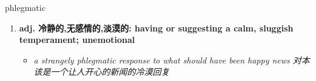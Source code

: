 
\begin{frame}
{\huge phlegmatic}
\begin{center}
\begin{enumerate}\Large
  \item \textbf{adj. 冷静的,无感情的,淡漠的: having or suggesting a calm, sluggish temperament; unemotional}
  \begin{itemize}
    \item \em{\Large{a strangely phlegmatic response to what should have been happy news 对本该是一个让人开心的新闻的冷漠回复}}
  \end{itemize}
\end{enumerate}
\end{center}
\end{frame}

